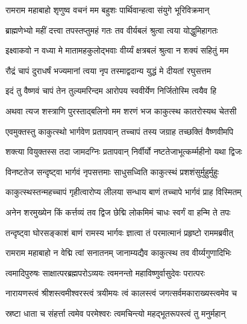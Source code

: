 
\twolineshloka
{रामराम महाबाहो शृणुष्व वचनं मम}
{बहुशः पार्थिवान्हत्वा संयुगे भूरिविक्रमान्}%

\twolineshloka
{ब्राह्मणेभ्यो महीं दत्त्वा तपस्तप्तुमहं गतः}
{तव वीर्यबलं श्रुत्वा त्वया योद्धुमिहागतः}%

\twolineshloka
{इक्ष्वाकवो न वध्या मे मातामहकुलोद्भवाः}
{वीर्य्यं क्षत्रबलं श्रुत्वा न शक्यं सहितुं मम}%

\twolineshloka
{रौद्रं चापं दुराधर्षं भज्यमानां त्वया नृप}
{तस्माद्वदान्य युद्धं मे दीयतां रघुसत्तम}%

\twolineshloka
{इदं तु वैष्णवं चापं तेन तुल्यमरिन्दम}
{आरोपय स्ववीर्येण निर्जितोस्मि त्वयैव हि}%

\twolineshloka
{अथवा त्यज शस्त्राणि पुरस्ताद्बलिनो मम}
{शरणं भज काकुत्स्थ कातरोस्यथ चेतसी}%


\twolineshloka
{एवमुक्तस्तु काकुत्स्थो भार्गवेण प्रतापवान्}
{तच्चापं तस्य जग्राह तच्छक्तिं वैष्णवीमपि}%

\twolineshloka
{शक्त्या वियुक्तस्स तदा जामदग्निः प्रतापवान्}
{निर्वीर्यो नष्टतेजाभूत्कर्म्महीनो यथा द्विजः}%

\twolineshloka
{विनष्टतेज सन्दृष्ट्वा भार्गवं नृपसत्तमाः}
{साधुसध्विति काकुत्स्थं प्रशशंसुर्मुहुर्मुहुः}%

\twolineshloka
{काकुत्स्थस्तन्महच्चापं गृहीत्वारोप्य लीलया}
{सन्धाय बाणं तच्चापे भार्गवं प्राह विस्मितम्}%


\twolineshloka
{अनेन शरमुख्येन किं कर्त्तव्यं तव द्विज}
{छेद्मि लोकमिमं चाधः स्वर्गं वा हन्मि ते तपः}%


\twolineshloka
{तन्दृष्ट्वा घोरसङ्काशं बाणं रामस्य भार्गवः}
{ज्ञात्वा तं परमात्मानं प्रहृष्टो राममब्रवीत्}%


\twolineshloka
{रामराम महाबाहो न वेद्मि त्वां सनातनम्}
{जानाम्यद्यैव काकुत्स्थ तव वीर्य्यगुणादिभिः}%

\twolineshloka
{त्वमादिपुरुषः साक्षात्परब्रह्मपरोऽव्ययः}
{त्वमनन्तो महाविष्णुर्वासुदेवः परात्परः}%

\twolineshloka
{नारायणस्त्वं श्रीशस्त्वमीश्वरस्त्वं त्रयीमयः}
{त्वं कालस्त्वं जगत्सर्वमकाराख्यस्त्वमेव च}%

\twolineshloka
{स्रष्टा धाता च संहर्त्ता त्वमेव परमेश्वरः}
{त्वमचिन्त्यो महद्भूतरूपस्त्वं तु मनुर्महान्}%

